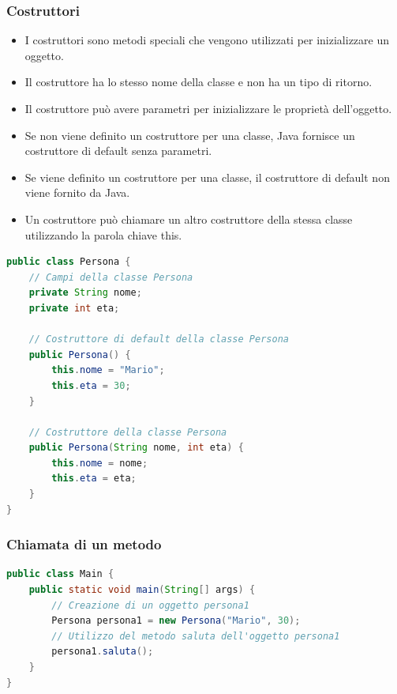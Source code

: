 \documentclass[11pt]{article}
\begin{document}
\subsubsection{Costruttori}
\begin{itemize}
    \item I costruttori sono metodi speciali che vengono utilizzati per inizializzare un oggetto.
    \item Il costruttore ha lo stesso nome della classe e non ha un tipo di ritorno.
    \item Il costruttore può avere parametri per inizializzare le proprietà dell'oggetto.
    \item Se non viene definito un costruttore per una classe, Java fornisce un costruttore di default senza parametri.
    \item Se viene definito un costruttore per una classe, il costruttore di default non viene fornito da Java.
    \item Un costruttore può chiamare un altro costruttore della stessa classe utilizzando la parola chiave this.
\end{itemize}
\begin{lstlisting}[language=Java]
public class Persona {
    // Campi della classe Persona
    private String nome;
    private int eta;

    // Costruttore di default della classe Persona
    public Persona() {
        this.nome = "Mario";
        this.eta = 30;
    }

    // Costruttore della classe Persona
    public Persona(String nome, int eta) {
        this.nome = nome;
        this.eta = eta;
    }
}
\end{lstlisting}
\subsubsection{Chiamata di un metodo}
\begin{lstlisting}[language=Java]
public class Main {
    public static void main(String[] args) {
        // Creazione di un oggetto persona1
        Persona persona1 = new Persona("Mario", 30);
        // Utilizzo del metodo saluta dell'oggetto persona1
        persona1.saluta();
    }
}
\end{lstlisting}
\end{document}
